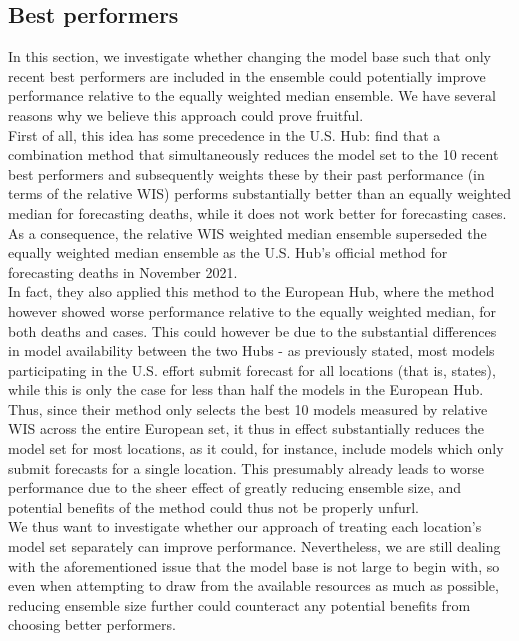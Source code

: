 \subsection{Best performers}
In this section, we investigate whether changing the model base such that only recent best performers are included in the ensemble could potentially improve performance relative to the equally weighted median ensemble. We have several reasons why we believe this approach could prove fruitful.\\
First of all, this idea has some precedence in the U.S. Hub: \cite{ray_comparing_2022} find that a combination method that simultaneously reduces the model set to the 10 recent best performers and subsequently weights these by their past performance (in terms of the relative WIS) performs substantially better than an equally weighted median for forecasting deaths, while it does not work better for forecasting cases. As a consequence, the relative WIS weighted median ensemble superseded the equally weighted median ensemble as the U.S. Hub's official method for forecasting deaths in November 2021.\\ 
In fact, they also applied this method to the European Hub, where the method however showed worse performance relative to the equally weighted median, for both deaths and cases. This could however be due to the substantial differences in model availability between the two Hubs - as previously stated, most models participating in the U.S. effort submit forecast for all locations (that is, states), while this is only the case for less than half the models in the European Hub. Thus, since their method only selects the best 10 models measured by relative WIS across the entire European set, it thus in effect substantially reduces the model set for most locations, as it could, for instance, include models which only submit forecasts for a single location. This presumably already leads to worse performance due to the sheer effect of greatly reducing ensemble size, and potential benefits of the method could thus not be properly unfurl.\\
We thus want to investigate whether our approach of treating each location's model set separately can improve performance. Nevertheless, we are still dealing with the aforementioned issue that the model base is not large to begin with, so even when attempting to draw from the available resources as much as possible, reducing ensemble size further could counteract any potential benefits from choosing better performers.\\
